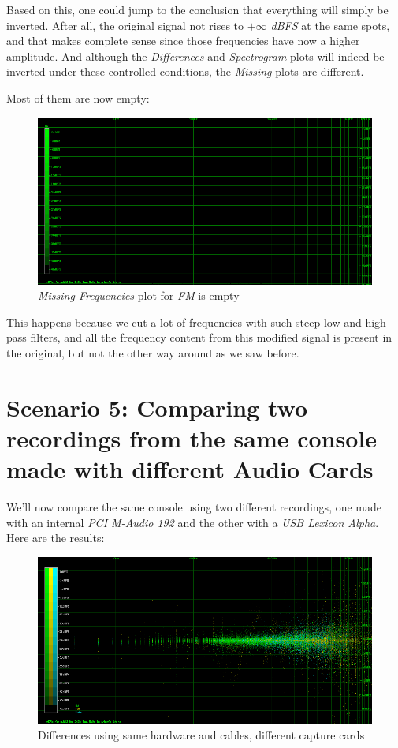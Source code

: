 \documentclass[10pt,a4paper]{report}
\begin{document}
Based on this, one could jump to the conclusion that everything will simply be inverted. After all, the original signal not rises to \textit{$+\infty$ dBFS} at the same spots, and that makes complete sense since those frequencies have now a higher amplitude. And although the \textit{Differences} and \textit{Spectrogram} plots will indeed be inverted under these controlled conditions, the \textit{Missing} plots are different.

Most of them are now empty:

\begin{figure}[H]
	\centering
	\includegraphics[width=1.0\linewidth]{plots/Plot4-8-Missing-FM-Inverted.png}
	\caption[Reversed FM Missing]{\textit{Missing Frequencies} plot for \textit{FM} is empty}
	\label{fig:plot4-8-missing-fm-inverted}
\end{figure}

This happens because we cut a lot of frequencies with such steep low and high pass filters, and all the frequency content from this modified signal is present in the original, but not the other way around as we saw before.

\section{Scenario 5: Comparing two recordings from the same console made with different Audio Cards}

We'll now compare the same console using two different recordings, one made with an internal \textit{PCI M-Audio 192} and the other with a \textit{USB Lexicon Alpha}. Here are the results:

\begin{figure}[H]
	\centering
	\includegraphics[width=1.0\linewidth]{plots/Plot5-1-All.png}
	\caption[Reversed FM Missing]{Differences using same hardware and cables, different capture cards}
	\label{fig:plot5-1-all}
\end{figure}
\end{document}
